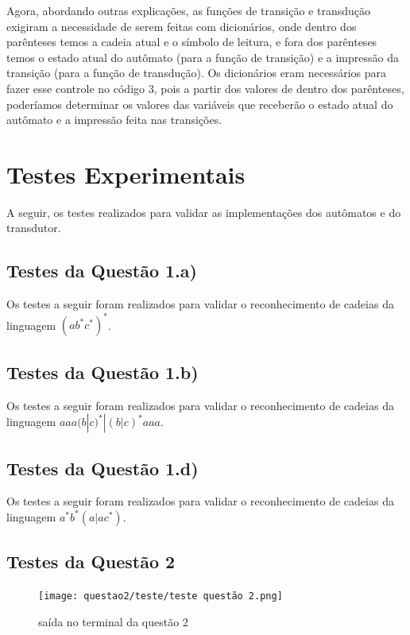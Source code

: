 \documentclass[12pt]{article}
\begin{document}
Agora, abordando outras explicações, as funções de transição e transdução exigiram a necessidade de serem feitas com dicionários, onde dentro dos parênteses temos a cadeia atual e o símbolo de leitura, e fora dos parênteses temos o estado atual do autômato (para a função de transição) e a impressão da transição (para a função de transdução). Os dicionários eram necessários para fazer esse controle no código 3, pois a partir dos valores de dentro dos parênteses, poderíamos determinar os valores das variáveis que receberão o estado atual do autômato e a impressão feita nas transições.

\section{\textbf{Testes Experimentais}}

A seguir, os testes realizados para validar as implementações dos autômatos e do transdutor.

\subsection{Testes da Questão 1.a)}

Os testes a seguir foram realizados para validar o reconhecimento de cadeias da linguagem \((ab^*c^*)^*\).



\subsection{Testes da Questão 1.b)}

Os testes a seguir foram realizados para validar o reconhecimento de cadeias da linguagem \(aaa(b | c)^* | (b | c)^* aaa\).



\subsection{Testes da Questão 1.d)}

Os testes a seguir foram realizados para validar o reconhecimento de cadeias da linguagem \(a^*b^*(a | ac^*)\).



\subsection{Testes da Questão 2}

\begin{figure}[H]
\centering
\texttt{[image: questao2/teste/teste questão 2.png]} 
\caption{saída no terminal da questão 2}
\label{fig:regexExplanation}
\end{figure}
\end{document}
